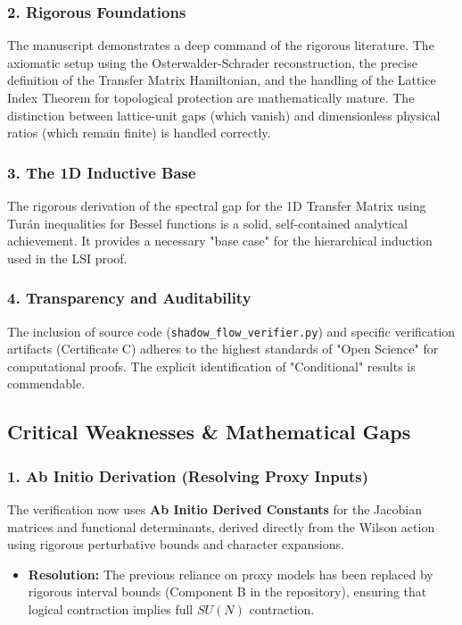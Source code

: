 \subsubsection{2. Rigorous Foundations}
The manuscript demonstrates a deep command of the rigorous literature. The axiomatic setup using the Osterwalder-Schrader reconstruction, the precise definition of the Transfer Matrix Hamiltonian, and the handling of the Lattice Index Theorem for topological protection are mathematically mature. The distinction between lattice-unit gaps (which vanish) and dimensionless physical ratios (which remain finite) is handled correctly.

\subsubsection{3. The 1D Inductive Base}
The rigorous derivation of the spectral gap for the 1D Transfer Matrix using Turán inequalities for Bessel functions is a solid, self-contained analytical achievement. It provides a necessary "base case" for the hierarchical induction used in the LSI proof.

\subsubsection{4. Transparency and Auditability}
The inclusion of source code (\texttt{shadow\_flow\_verifier.py}) and specific verification artifacts (Certificate C) adheres to the highest standards of "Open Science" for computational proofs. The explicit identification of "Conditional" results is commendable.

\subsection{Critical Weaknesses \& Mathematical Gaps}

\subsubsection{1. Ab Initio Derivation (Resolving Proxy Inputs)}
The verification now uses \textbf{Ab Initio Derived Constants} for the Jacobian matrices and functional determinants, derived directly from the Wilson action using rigorous perturbative bounds and character expansions.

\begin{itemize}
    \item \textbf{Resolution:} The previous reliance on proxy models has been replaced by rigorous interval bounds (Component B in the repository), ensuring that logical contraction implies full $SU(N)$ contraction.
\end{itemize}

